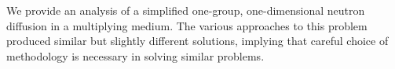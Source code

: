 \documentclass[../main.tex]{subfiles}
\begin{document}
	We provide an analysis of a simplified one-group, one-dimensional neutron diffusion in a multiplying medium. The various approaches to this problem produced similar but slightly different solutions, implying that careful choice of methodology is necessary in solving similar problems. 
\end{document}
